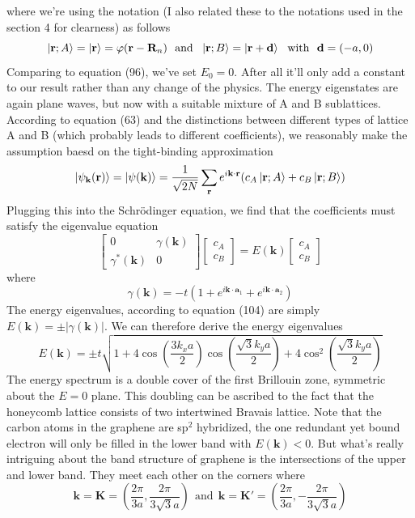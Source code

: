 \documentclass{article}
\begin{document}
where we're using the notation (I also related these to the notations used in the section 4 for clearness) as follows\begin{equation}
    \ket{\mathbf{r};A}=\ket{\mathbf{r}}=\varphi(\mathbf{r}-\mathbf{R}_n)~~\mathrm{and}~~\ket{\mathbf{r};B}=\ket{\mathbf{r}+\mathbf{d}}~~\mathrm{with}~~\mathbf{d}=(-a,0)
\end{equation}
Comparing to equation (96), we've set $E_0=0$. After all it'll only add a constant to our result rather than any change of the physics. The energy eigenstates are again plane waves, but now with a suitable mixture of A and B sublattices. According to equation (63) and the distinctions between different types of lattice A and B (which probably leads to different coefficients), we reasonably make the assumption baesd on the tight-binding approximation\begin{equation}
    \ket{\psi_\mathbf{k}(\mathbf{r})}=\ket{\psi(\mathbf{k})}=\frac{1}{\sqrt{2N}}\sum_{\mathbf{r}}e^{i\mathbf{k}\cdot\mathbf{r}}(c_A\ket{\mathbf{r};A}+c_B\ket{\mathbf{r};B})
\end{equation}
Plugging this into the Schr\"odinger equation, we find that the coefficients must satisfy the eigenvalue equation\begin{equation}\begin{bmatrix}
0 & \gamma(\mathbf{k})\\
\gamma^*(\mathbf{k}) & 0
\end{bmatrix}\begin{bmatrix}
c_A\\
c_B
\end{bmatrix}=E(\mathbf{k})\begin{bmatrix}
c_A\\
c_B
\end{bmatrix}
\end{equation}
where\begin{equation}
    \gamma(\mathbf{k})=-t(1+e^{i\mathbf{k}\cdot\mathbf{a}_1}+e^{i\mathbf{k}\cdot\mathbf{a}_2})
\end{equation}
The energy eigenvalues, according to equation (104) are simply $E(\mathbf{k})=\pm|\gamma(\mathbf{k})|$. We can therefore derive the energy eigenvalues\begin{equation}
    E(\mathbf{k})=\pm{t}\sqrt{1+4\cos(\frac{3k_xa}{2})\cos(\frac{\sqrt3k_ya}{2})+4\cos^2(\frac{\sqrt3k_ya}{2})}
\end{equation}
The energy spectrum is a double cover of the first Brillouin zone, symmetric about the $E=0$ plane. This doubling can be ascribed to the fact that the honeycomb lattice consists of two intertwined Bravais lattice. Note that the carbon atoms in the graphene are sp$^2$ hybridized, the one redundant yet bound electron will only be filled in the lower band with $E(\mathbf{k})<0$. But what's really intriguing about the band structure of graphene is the intersections of the upper and lower band. They meet each other on the corners where\begin{equation}
    \mathbf{k}=\mathbf{K}=(\frac{2\pi}{3a},\frac{2\pi}{3\sqrt3a})~~\mathrm{and}~~\mathbf{k}=\mathbf{K}'=(\frac{2\pi}{3a},-\frac{2\pi}{3\sqrt3a})
\end{equation}
\end{document}

